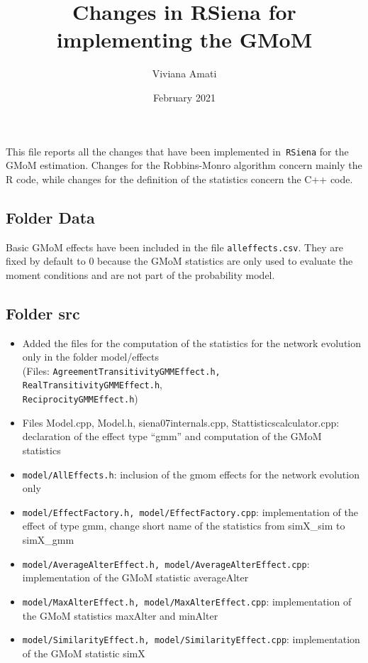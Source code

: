 \documentclass[a4paper,11pt]{article}
\title{Changes in RSiena for implementing the GMoM}
\author{Viviana Amati}
\date{February 2021}
\begin{document}
\maketitle
This file reports all the changes that have been implemented in\texttt{ RSiena} for the GMoM estimation. Changes for the Robbins-Monro algorithm concern mainly the R code, while changes for the definition of the statistics concern the C++ code.

\subsection*{Folder Data}
Basic GMoM effects have been included in the file \texttt{alleffects.csv}. They are fixed by default to 0 because the GMoM statistics are only used to evaluate the moment conditions and are not part of the probability model.

\subsection*{Folder src}
\begin{itemize}
\item Added the files for the computation of the statistics for the network evolution only in the folder model/effects\\
(Files: \texttt{AgreementTransitivityGMMEffect.h, RealTransitivityGMMEffect.h},\\\texttt{ReciprocityGMMEffect.h})
	\item Files Model.cpp, Model.h, siena07internals.cpp, Stattisticscalculator.cpp: declaration of the effect type ``gmm'' and computation of the GMoM statistics
	\item \texttt{model/AllEffects.h}: inclusion of the gmom effects for the network evolution only
	\item \texttt{model/EffectFactory.h, model/EffectFactory.cpp}: implementation of the effect of type gmm, change short name of the statistics from simX\_sim to simX\_gmm
	\item \texttt{model/AverageAlterEffect.h, model/AverageAlterEffect.cpp}: implementation of the GMoM statistic averageAlter
	\item \texttt{model/MaxAlterEffect.h, model/MaxAlterEffect.cpp}: implementation of the GMoM statistics maxAlter and minAlter
	\item \texttt{model/SimilarityEffect.h, model/SimilarityEffect.cpp}: implementation of the GMoM statistic simX
\end{itemize}
\end{document}
